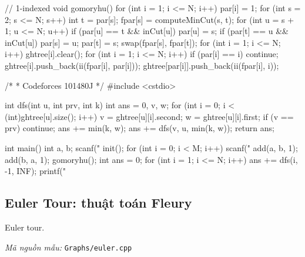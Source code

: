 \documentclass[11pt]{article}
\newcommand{\codepath}[1]{\par\noindent\textit{Mã nguồn mẫu:} \texttt{#1}\par}
\begin{document}
\begin{vncode}
// 1-indexed
void gomoryhu()
{
	for (int i = 1; i <= N; i++)
		par[i] = 1;
	for (int s = 2; s <= N; s++)
	{
		int t = par[s];
		fpar[s] = computeMinCut(s, t);
		for (int u = s + 1; u <= N; u++)
		{
			if (par[u] == t && inCut[u])
			{
				par[u] = s;
			}
			if (par[t] == u && inCut[u])
			{
				par[s] = u;
				par[t] = s;
				swap(fpar[s], fpar[t]);
			}
		}
	}
	for (int i = 1; i <= N; i++)
		ghtree[i].clear();
	for (int i = 1; i <= N; i++)
	{
		if (par[i] == i)
			continue;
		ghtree[i].push_back(ii(fpar[i], par[i]));
		ghtree[par[i]].push_back(ii(fpar[i], i));
	}
}

/*
 * Codeforces 101480J
 */
#include <cstdio>

int dfs(int u, int prv, int k)
{
	int ans = 0, v, w;
	for (int i = 0; i < (int)ghtree[u].size(); i++)
	{
		v = ghtree[u][i].second;
		w = ghtree[u][i].first;
		if (v == prv)
			continue;
		ans += min(k, w);
		ans += dfs(v, u, min(k, w));
	}
	return ans;
}

int main()
{
	int a, b;
	scanf("%
	init();
	for (int i = 0; i < M; i++)
	{
		scanf("%
		add(a, b, 1);
		add(b, a, 1);
	}
	gomoryhu();
	int ans = 0;
	for (int i = 1; i <= N; i++)
	{
		ans += dfs(i, -1, INF);
	}
	printf("%
}
\end{vncode}
\endgroup


\subsection{Euler Tour: thuật toán Fleury}

Euler tour.

\codepath{Graphs/euler.cpp}
\end{document}
